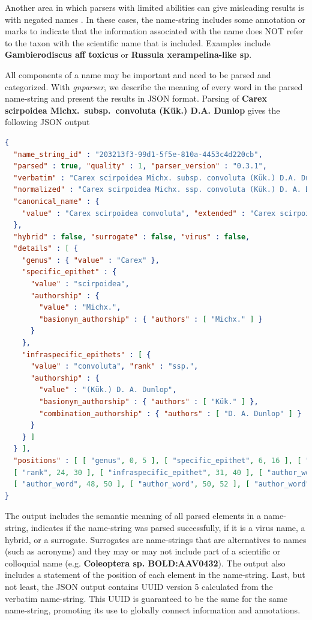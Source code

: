 \documentclass{bmcart}
\begin{document}
Another area in which parsers with limited abilities can give misleading results is with negated names \cite{Patterson2016}. In these cases, the name-string includes some annotation or marks to indicate that the information associated with the name does NOT refer to the taxon with the scientific name that is included. Examples include \textbf{Gambierodiscus aff toxicus} or \textbf{Russula xerampelina-like sp}.

All components of a name may be important and need to be parsed and categorized. With \textit{gnparser}, we describe the meaning of every word in the parsed name-string and present the results in JSON format. Parsing of \textbf{Carex scirpoidea Michx.\ subsp.\ convoluta (Kük.) D.A. Dunlop} gives the following JSON output

\vspace{0.1cm}

\begin{lstlisting}[language=json]
{
  "name_string_id" : "203213f3-99d1-5f5e-810a-4453c4d220cb",
  "parsed" : true, "quality" : 1, "parser_version" : "0.3.1",
  "verbatim" : "Carex scirpoidea Michx. subsp. convoluta (Kük.) D.A. Dunlop",
  "normalized" : "Carex scirpoidea Michx. ssp. convoluta (Kük.) D. A. Dunlop",
  "canonical_name" : {
    "value" : "Carex scirpoidea convoluta", "extended" : "Carex scirpoidea ssp. convoluta"
  },
  "hybrid" : false, "surrogate" : false, "virus" : false,
  "details" : [ {
    "genus" : { "value" : "Carex" },
    "specific_epithet" : {
      "value" : "scirpoidea",
      "authorship" : {
        "value" : "Michx.",
        "basionym_authorship" : { "authors" : [ "Michx." ] }
      }
    },
    "infraspecific_epithets" : [ {
      "value" : "convoluta", "rank" : "ssp.",
      "authorship" : {
        "value" : "(Kük.) D. A. Dunlop",
        "basionym_authorship" : { "authors" : [ "Kük." ] },
        "combination_authorship" : { "authors" : [ "D. A. Dunlop" ] }
      }
    } ]
  } ],
  "positions" : [ [ "genus", 0, 5 ], [ "specific_epithet", 6, 16 ], [ "author_word", 17, 23 ],
  [ "rank", 24, 30 ], [ "infraspecific_epithet", 31, 40 ], [ "author_word", 42, 46 ],
  [ "author_word", 48, 50 ], [ "author_word", 50, 52 ], [ "author_word", 53, 59 ] ]
}
\end{lstlisting}

\vspace{0.5cm}

The output includes the semantic meaning of all parsed elements in a name-string, indicates if the name-string was parsed successfully, if it is a virus name, a hybrid, or a surrogate. Surrogates are name-strings that are alternatives to names (such as acronyms) and they may or may not include part of a scientific or colloquial name (e.g. \textbf{Coleoptera sp. BOLD:AAV0432}).  The output also includes a statement of the position of each element in the name-string. Last, but not least, the JSON output contains UUID version 5 calculated from the verbatim name-string. This UUID is guaranteed to be the same for the same name-string, promoting its use to globally connect information and annotations.
\end{document}
